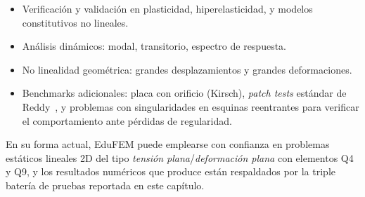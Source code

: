 \begin{itemize}
  \item Verificación y validación en plasticidad, hiperelasticidad, y
        modelos constitutivos no lineales.
  \item Análisis dinámicos: modal, transitorio, espectro de respuesta.
  \item No linealidad geométrica: grandes desplazamientos y grandes deformaciones.
  \item Benchmarks adicionales: placa con orificio (Kirsch), \emph{patch tests}
        estándar de Reddy~\cite{reddy2019fem}, y problemas con singularidades
        en esquinas reentrantes para verificar el comportamiento ante
        pérdidas de regularidad.
\end{itemize}

\noindent En su forma actual, EduFEM puede emplearse con confianza en
problemas estáticos lineales 2D del tipo
\emph{tensión plana}/\emph{deformación plana} con elementos Q4 y Q9, y
los resultados numéricos que produce están respaldados por la triple
batería de pruebas reportada en este capítulo.
